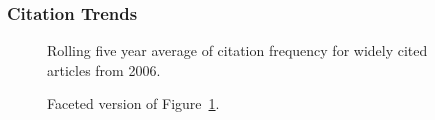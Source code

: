 \documentclass[
  10pt,
  letterpaper,
  DIV=11,
  numbers=noendperiod,
  twoside]{scrartcl}
\begin{document}
\subsubsection*{Citation Trends}\label{citation-trends-30}

\begin{figure}


\caption{\label{fig-citation-spaghetti-2006}Rolling five year average of
citation frequency for widely cited articles from 2006.}

\end{figure}%

\begin{figure}


\caption{\label{fig-citation-facet-2006}Faceted version of
Figure~\ref{fig-citation-spaghetti-2006}.}

\end{figure}%
\end{document}
